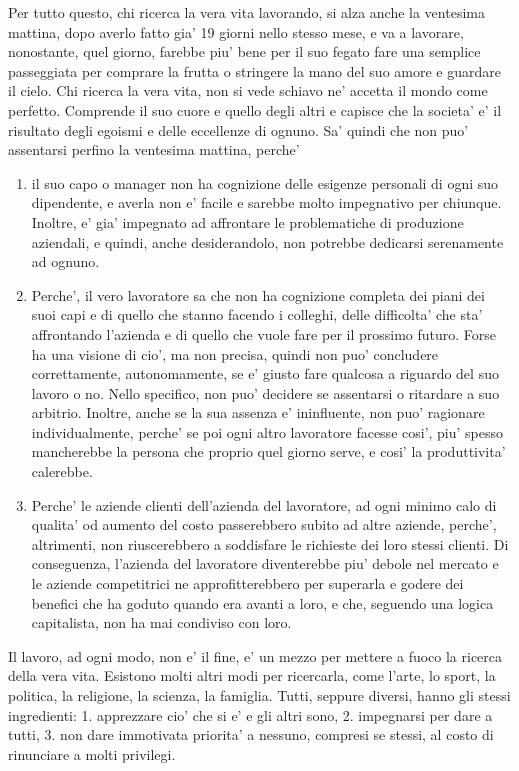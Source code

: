 Per tutto questo, chi ricerca la vera vita lavorando, si alza anche la ventesima mattina, dopo averlo fatto gia' 19 giorni nello stesso mese, e va a lavorare, nonostante, quel giorno, farebbe piu' bene per il suo fegato fare una semplice passeggiata per comprare la frutta o stringere la mano del suo amore e guardare il cielo. Chi ricerca la vera vita, non si vede schiavo ne' accetta il mondo come perfetto. Comprende il suo cuore e quello degli altri e capisce che la societa' e' il risultato degli egoismi e delle eccellenze di ognuno. Sa' quindi che non puo' assentarsi perfino la ventesima mattina, perche'
\begin{enumerate}
    \item il suo capo o manager non ha cognizione delle esigenze personali di ogni suo dipendente, e averla non e' facile e sarebbe molto impegnativo per chiunque. Inoltre, e' gia' impegnato ad affrontare le problematiche di produzione aziendali, e quindi, anche desiderandolo, non potrebbe dedicarsi serenamente ad ognuno.
    \item Perche', il vero lavoratore sa che non ha cognizione completa dei piani dei suoi capi e di quello che stanno facendo i colleghi, delle difficolta' che sta' affrontando l'azienda e di quello che vuole fare per il prossimo futuro.
   Forse ha una visione di cio', ma non precisa, quindi non puo' concludere correttamente, autonomamente, se e' giusto fare qualcosa a riguardo del suo lavoro o no. Nello specifico, non puo' decidere se assentarsi o ritardare a suo arbitrio. Inoltre, anche se la sua assenza e' ininfluente, non puo' ragionare individualmente, perche' se poi ogni altro lavoratore facesse cosi', piu' spesso mancherebbe la persona che proprio quel giorno serve, e cosi' la produttivita' calerebbe.
    \item Perche' le aziende clienti dell'azienda del lavoratore, ad ogni minimo calo di qualita' od aumento del costo passerebbero subito ad altre aziende, perche', altrimenti, non riuscerebbero a soddisfare le richieste dei loro stessi clienti. Di conseguenza, l'azienda del lavoratore diventerebbe piu' debole nel mercato e le aziende competitrici ne approfitterebbero per superarla e godere dei benefici che ha goduto quando era avanti a loro, e che, seguendo una logica capitalista, non ha mai condiviso con loro.

\end{enumerate}
Il lavoro, ad ogni modo, non e' il fine, e' un mezzo per mettere a fuoco la ricerca della vera vita. Esistono molti altri modi per ricercarla, come l'arte, lo sport, la politica, la religione, la scienza, la famiglia. Tutti, seppure diversi, hanno gli stessi ingredienti: 1. apprezzare cio' che si e' e gli altri sono, 2. impegnarsi per dare a tutti, 3. non dare immotivata priorita' a nessuno, compresi se stessi, al costo di rinunciare a molti privilegi.

